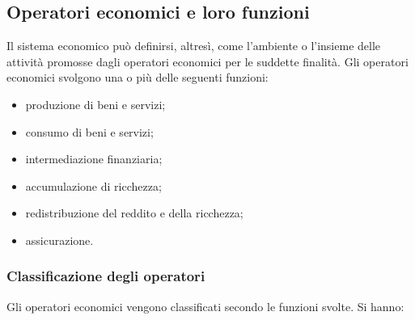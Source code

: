 \subsection{Operatori economici e loro funzioni}

Il sistema economico può definirsi, altresì, come l'ambiente o l'insieme delle 
attività promosse dagli operatori economici per le suddette finalità. Gli 
operatori economici svolgono una o più delle seguenti funzioni:

\begin{itemize} [noitemsep]
\item produzione di beni e servizi;
\item consumo di beni e servizi;
\item intermediazione finanziaria;
\item accumulazione di ricchezza;
\item redistribuzione del reddito e della ricchezza;
\item assicurazione.
\end{itemize}

\subsubsection{Classificazione degli operatori}
Gli operatori economici vengono classificati secondo le funzioni svolte. Si 
hanno:

